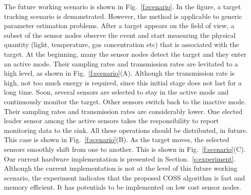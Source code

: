 The future working scenario is shown in Fig.~\ref{f:scenario}.
In the figure, a target tracking scenario is demonstrated. However, the
method is applicable to generic parameter estimation problems.
After a target appears on the field of view, a subset of
the sensor nodes observe the event and start measuring the
physical quantity (light, temperature, gas concentration etc)
that is associated with the target. At the beginning, many
the sensor nodes detect the target and they enter an active mode.
Their sampling rates and transmission rates are levitated to a high level, as shown in Fig.~\ref{f:scenario}(A).
Although the transmission rate is high, not too much energy is
required, since this initial stage does not last for a long time.
    Soon, several sensors are selected to stay in the active mode
    and continuously monitor the target.
    Other sensors switch back to the inactive mode. Their sampling rates and transmission rates are considerably lower.
    One elected leader sensor among the
    active sensors takes the responsibility to report monitoring data to the sink.
    All these operations should be distributed, in future. This case is shown in
    Fig.~\ref{f:scenario}(B).
        As the target moves, the selected sensors smoothly shift from one to another. This
        is shown in Fig.~\ref{f:scenario}(C).
            Our current hardware implementation is presented in Section.~\ref{s:experiment}. Although the current implementation is not at the level of this future working scenario, the experiment indicates that the proposed COSS algorithm is fast and memory efficient. It has potentials to be implemented on low cost sensor nodes.



